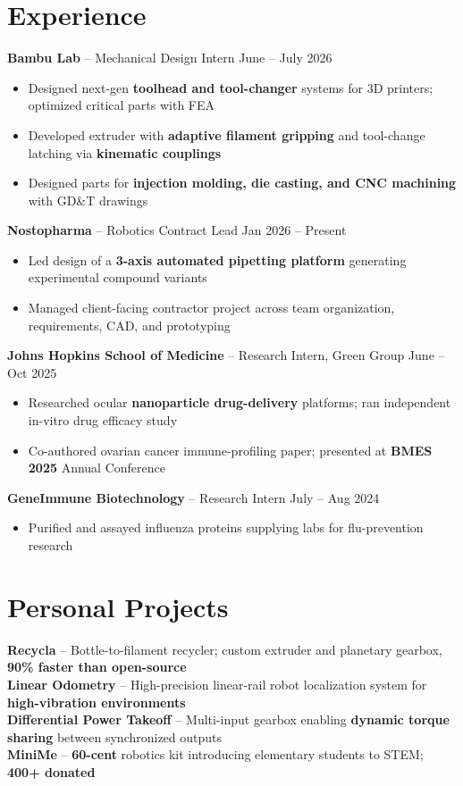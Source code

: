\documentclass[10pt, letterpaper]{article}
\begin{document}
\section{Experience}
    \textbf{Bambu Lab} -- Mechanical Design Intern
    \hfill June -- July 2026
    \begin{itemize}
        \item Designed next-gen \textbf{toolhead and tool-changer} systems for 3D printers; optimized critical parts with FEA
        \item Developed extruder with \textbf{adaptive filament gripping} and tool-change latching via \textbf{kinematic couplings}
        \item Designed parts for \textbf{injection molding, die casting, and CNC machining} with GD\&T drawings
    \end{itemize}
    \textbf{Nostopharma} -- Robotics Contract Lead
    \hfill Jan 2026 -- Present
    \begin{itemize}
        \item Led design of a \textbf{3-axis automated pipetting platform} generating experimental compound variants
        \item Managed client-facing contractor project across team organization, requirements, CAD, and prototyping
    \end{itemize}
    \textbf{Johns Hopkins School of Medicine} -- Research Intern, Green Group
    \hfill June -- Oct 2025
    \begin{itemize}
        \item Researched ocular \textbf{nanoparticle drug-delivery} platforms; ran independent in-vitro drug efficacy study
        \item Co-authored ovarian cancer immune-profiling paper; presented at \textbf{BMES 2025} Annual Conference
    \end{itemize}
    \textbf{GeneImmune Biotechnology} -- Research Intern
    \hfill July -- Aug 2024
    \begin{itemize}
        \item Purified and assayed influenza proteins supplying labs for flu-prevention research
    \end{itemize}

\section{Personal Projects}
    \textbf{Recycla} -- Bottle-to-filament recycler; custom extruder and planetary gearbox, \textbf{90\% faster than open-source} \\
    \textbf{Linear Odometry} -- High-precision linear-rail robot localization system for \textbf{high-vibration environments} \\
    \textbf{Differential Power Takeoff} -- Multi-input gearbox enabling \textbf{dynamic torque sharing} between synchronized outputs \\
    \textbf{MiniMe} -- \textbf{60-cent} robotics kit introducing elementary students to STEM; \textbf{400+ donated}
\end{document}
